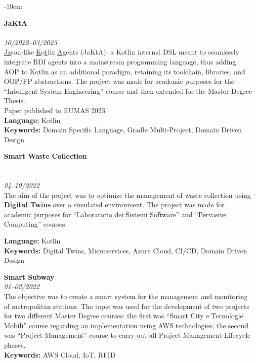 \documentclass[10pt,a4paper]{altacv}
\begin{document}
\begin{adjustwidth}{}{-10cm}

    \textbf{JaKtA}\\
    \\
    \textit{10/2022--03/2023}\\ \smallskip
    \underline{Ja}son-like \underline{K}o\underline{t}lin \underline{A}gents (JaKtA): a Kotlin internal DSL meant to seamlessly integrate BDI agents into a mainstream programming language, thus adding AOP to Kotlin as an additional paradigm, retaining its toolchain, libraries, and OOP/FP abstractions. The project was made for academic purposes for the ``Intelligent System Engineering'' course and then extended for the Master Degree Thesis.\\ \smallskip
    {\small \notesymbol \hspace{0.5em} Paper published to EUMAS 2023}\\
    \smallskip
    \textbf{Language:} Kotlin\\
    \textbf{Keywords:} Domain Specific Language, Gradle Multi-Project, Domain Driven Design

    \divider


    \textbf{Smart Waste Collection}\\
    \\
    \\
    \textit{04--10/2022}\\ \smallskip
    The aim of the project was to optimize the management of waste collection using \textbf{Digital Twins} over a simulated environment.
    The project was made for academic purposes for ``Laboratorio dei Sistemi Software'' and ``Pervasive Computing'' courses.\\
    \smallskip

    \textbf{Language:} Kotlin\\
    \textbf{Keywords:} Digital Twins, Microservices, Azure Cloud, CI/CD, Domain Driven Design

    \divider

    \textbf{Smart Subway}\\
    \textit{01--02/2022}\\ \smallskip
    The objective was to create a smart system for the management and monitoring of metropolitan stations.
    The topic was used for the development of two projects for two different Master Degree courses: the first was ``Smart City e Tecnologie Mobili'' course regarding an implementation using AWS technologies,
    the second was ``Project Management'' course to carry out all Project Management Lifecycle phases.\\ \smallskip
    \textbf{Keywords:} AWS Cloud, IoT, RFID


\end{adjustwidth}
\end{document}
